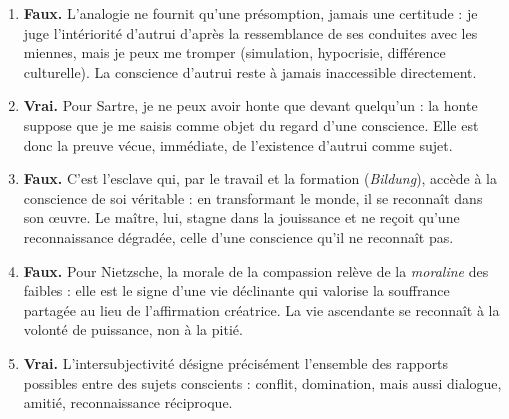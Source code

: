 \documentclass[11pt]{article}
\begin{document}
\begin{corrige}
\begin{enumerate}
\item \textbf{Faux.} L'analogie ne fournit qu'une présomption, jamais une certitude : je juge l'intériorité d'autrui d'après la ressemblance de ses conduites avec les miennes, mais je peux me tromper (simulation, hypocrisie, différence culturelle). La conscience d'autrui reste à jamais inaccessible directement.
\item \textbf{Vrai.} Pour Sartre, je ne peux avoir honte que devant quelqu'un : la honte suppose que je me saisis comme objet du regard d'une conscience. Elle est donc la preuve vécue, immédiate, de l'existence d'autrui comme sujet.
\item \textbf{Faux.} C'est l'esclave qui, par le travail et la formation (\emph{Bildung}), accède à la conscience de soi véritable : en transformant le monde, il se reconnaît dans son œuvre. Le maître, lui, stagne dans la jouissance et ne reçoit qu'une reconnaissance dégradée, celle d'une conscience qu'il ne reconnaît pas.
\item \textbf{Faux.} Pour Nietzsche, la morale de la compassion relève de la \emph{moraline} des faibles : elle est le signe d'une vie déclinante qui valorise la souffrance partagée au lieu de l'affirmation créatrice. La vie ascendante se reconnaît à la volonté de puissance, non à la pitié.
\item \textbf{Vrai.} L'intersubjectivité désigne précisément l'ensemble des rapports possibles entre des sujets conscients : conflit, domination, mais aussi dialogue, amitié, reconnaissance réciproque.
\end{enumerate}
\end{corrige}
\end{document}
